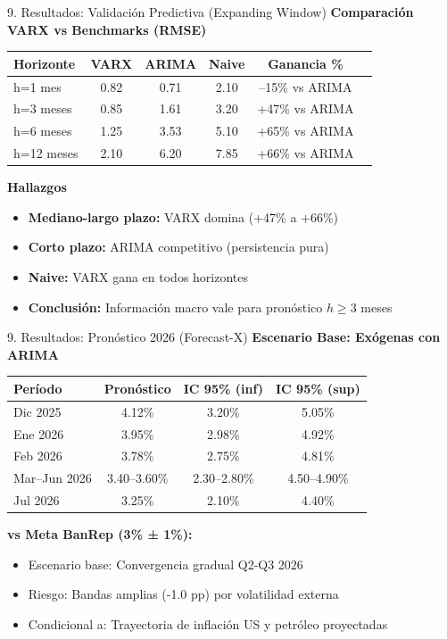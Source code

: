 \documentclass[spanish, 11pt]{beamer}
\begin{document}
\begin{frame}{9. Resultados: Validación Predictiva (Expanding Window)}
\textbf{Comparación VARX vs Benchmarks (RMSE)}

\vspace{0.2cm}
\centering
\begin{tabular}{lccccc}
\toprule
\textbf{Horizonte} & \textbf{VARX} & \textbf{ARIMA} & \textbf{Naive} & \textbf{Ganancia \%} \\
\midrule
h=1 mes & 0.82 & 0.71 & 2.10 & --15\% vs ARIMA \\
h=3 meses & 0.85 & 1.61 & 3.20 & +47\% vs ARIMA \\
h=6 meses & 1.25 & 3.53 & 5.10 & +65\% vs ARIMA \\
h=12 meses & 2.10 & 6.20 & 7.85 & +66\% vs ARIMA \\
\bottomrule
\end{tabular}

\vspace{0.3cm}
\textbf{Hallazgos}
\begin{itemize}
  \item \textbf{Mediano-largo plazo:} VARX domina (+47\% a +66\%)
  \item \textbf{Corto plazo:} ARIMA competitivo (persistencia pura)
  \item \textbf{Naive:} VARX gana en todos horizontes
  \item \textbf{Conclusión:} Información macro vale para pronóstico $h \geq 3$ meses
\end{itemize}
\end{frame}

\begin{frame}{9. Resultados: Pronóstico 2026 (Forecast-X)}
\textbf{Escenario Base: Exógenas con ARIMA}

\vspace{0.2cm}
\centering
\small
\begin{tabular}{lccc}
\toprule
\textbf{Período} & \textbf{Pronóstico} & \textbf{IC 95\% (inf)} & \textbf{IC 95\% (sup)} \\
\midrule
Dic 2025 & 4.12\% & 3.20\% & 5.05\% \\
Ene 2026 & 3.95\% & 2.98\% & 4.92\% \\
Feb 2026 & 3.78\% & 2.75\% & 4.81\% \\
Mar--Jun 2026 & 3.40--3.60\% & 2.30--2.80\% & 4.50--4.90\% \\
Jul 2026 & 3.25\% & 2.10\% & 4.40\% \\
\bottomrule
\end{tabular}

\vspace{0.2cm}
\textbf{vs Meta BanRep (3\% ± 1\%):}
\begin{itemize}
  \item Escenario base: Convergencia gradual Q2-Q3 2026
  \item Riesgo: Bandas amplias (-1.0 pp) por volatilidad externa
  \item Condicional a: Trayectoria de inflación US y petróleo proyectadas
\end{itemize}
\end{frame}
\end{document}
